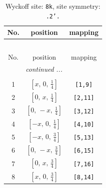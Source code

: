 \documentclass[fleqn,8pt]{jsarticle}
\begin{document}
\begin{longtable}{ccc}
\caption{Wyckoff site: {\tt 8k}, site symmetry: {\tt .2'.}}
 \\
 \hline \hline
No. & position & mapping \\ \hline \endfirsthead

\multicolumn{2}{l}{\tablename\ \thetable{}} \\
 \hline \hline
No. & position & mapping \\ \hline \endhead

 \hline \hline
\multicolumn{2}{r}{\footnotesize\it continued ...} \\ \endfoot

 \hline \hline
\multicolumn{2}{r}{} \\ \endlastfoot

1 & $\left[ x,\, 0,\, \frac{1}{4} \right]$ & {\tt [1,9]} \\ \hline
2 & $\left[ 0,\, x,\, \frac{1}{4} \right]$ & {\tt [2,11]} \\ \hline
3 & $\left[ 0,\, - x,\, \frac{1}{4} \right]$ & {\tt [3,12]} \\ \hline
4 & $\left[ - x,\, 0,\, \frac{1}{4} \right]$ & {\tt [4,10]} \\ \hline
5 & $\left[ - x,\, 0,\, \frac{3}{4} \right]$ & {\tt [5,13]} \\ \hline
6 & $\left[ 0,\, - x,\, \frac{3}{4} \right]$ & {\tt [6,15]} \\ \hline
7 & $\left[ 0,\, x,\, \frac{3}{4} \right]$ & {\tt [7,16]} \\ \hline
8 & $\left[ x,\, 0,\, \frac{3}{4} \right]$ & {\tt [8,14]} \\
\end{longtable}
\renewcommand{\arraystretch}{1.2}
\end{document}
